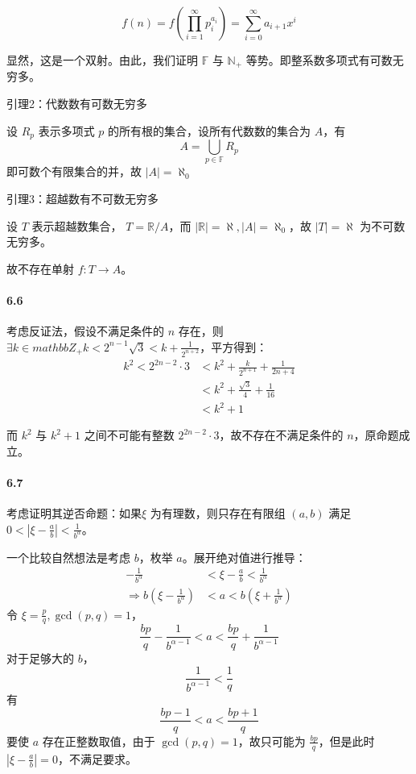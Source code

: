 \documentclass[12pt, a4paper, oneside]{ctexart}
\begin{document}
	$$
	f(n)=f(\prod_{i=1}^\infty p_i^{a_i})=\sum_{i=0}^\infty a_{i+1}x^i
	$$
	
	显然，这是一个双射。由此，我们证明 $\mathbb F$ 与 $\mathbb N_+$ 等势。即整系数多项式有可数无穷多。
	
	引理2：{\kaishu 代数数有可数无穷多}
	
	设 $R_p$ 表示多项式 $p$ 的所有根的集合，设所有代数数的集合为 $A$，有 $$A=\bigcup\limits_{p\in\mathbb F}R_p$$ 即可数个有限集合的并，故 $|A|=\aleph_0$
	
	引理3：{\kaishu 超越数有不可数无穷多}
	
	设 $T$ 表示超越数集合， $T = \mathbb R / A$，而 $|\mathbb R|=\aleph,|A|=\aleph_0$，故 $|T|=\aleph$ 为不可数无穷多。
	
	故不存在单射 $f:T\rightarrow A$。
	
	\paragraph{6.6}
	
	考虑反证法，假设不满足条件的 $n$ 存在，则 $\exists k\in mathbb Z_+ k<2^{n-1}\sqrt 3 < k + \frac{1}{2^{n+2}}$，平方得到： $$\begin{aligned}
		k^2<2^{2n-2}\cdot 3&<k^2+\frac{k}{2^{n+1}}+\frac{1}{2n+4}\\
		&<k^2+\frac{\sqrt{3}}4+\frac{1}{16}\\
		&<k^2+1
		\end{aligned}
		$$
	
	而 $k^2$ 与 $k^2+1$ 之间不可能有整数 $2^{2n-2}\cdot 3$，故不存在不满足条件的 $n$，原命题成立。
	
	\paragraph{6.7}
	
	考虑证明其逆否命题：{\kaishu 如果$\xi$ 为有理数，则只存在有限组 $(a,b)$ 满足 $0<|\xi - \frac{a}b|<\frac{1}{b^\alpha}$。}
	
	一个比较自然想法是考虑 $b$，枚举 $a$。展开绝对值进行推导：
	$$
	\begin{aligned}
		-\frac{1}{b^\alpha}&<\xi-\frac{a}b<\frac{1}{b^\alpha}\\
		\Rightarrow b(\xi-\frac{1}{b^{\alpha}})&<a<b(\xi+\frac{1}{b^\alpha})
	\end{aligned}
	$$
	令 $\xi=\frac{p}q,\gcd(p,q)=1$，$$\frac{bp}q-\frac{1}{b^{\alpha-1}}<a<\frac{bp}q+\frac{1}{b^{\alpha-1}}$$
	对于足够大的 $b$，$$\frac{1}{b^{\alpha-1}}<\frac{1}q$$ 有
	$$
	\frac{bp-1}q<a<\frac{bp+1}q
	$$
	要使 $a$ 存在正整数取值，由于 $\gcd(p,q)=1$，故只可能为 $\frac{bp}q$，但是此时 $|\xi-\frac{a}b|=0$，不满足要求。
	
\end{document}
